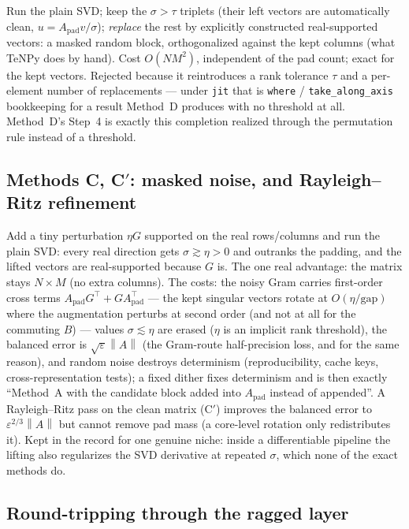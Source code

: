 \documentclass[11pt]{article}
\theoremstyle{definition}
\theoremstyle{remark}
\newcommand{\Apad}{A_{\mathrm{pad}}}
\newcommand{\norm}[1]{\left\lVert #1 \right\rVert}
\newcommand{\code}[1]{\texttt{#1}}
\begin{document}
Run the plain SVD; keep the $\sigma > \tau$ triplets (their left vectors are automatically clean,
$u = \Apad v/\sigma$); \emph{replace} the rest by explicitly constructed real-supported vectors: a
masked random block, orthogonalized against the kept columns (what TeNPy does by hand). Cost
$O(NM^2)$, independent of the pad count; exact for the kept vectors. Rejected because it
reintroduces a rank tolerance $\tau$ and a per-element number of replacements --- under \code{jit}
that is \code{where} / \code{take\_along\_axis} bookkeeping for a result Method~D produces with no
threshold at all. Method~D's Step~4 is exactly this completion realized through the permutation
rule instead of a threshold.

\subsection{Methods C, C$'$: masked noise, and Rayleigh--Ritz refinement}\label{app:C}

Add a tiny perturbation $\eta G$ supported on the real rows/columns and run the plain SVD: every
real direction gets $\sigma \gtrsim \eta > 0$ and outranks the padding, and the lifted vectors are
real-supported because $G$ is. The one real advantage: the matrix stays $N\times M$ (no extra
columns). The costs: the noisy Gram carries first-order cross terms $\Apad G^{\top} + G\Apad^{\top}$
--- the kept singular vectors rotate at $O(\eta/\mathrm{gap})$ where the augmentation perturbs at
second order (and not at all for the commuting $B$) --- values $\sigma\lesssim\eta$ are erased
($\eta$ is an implicit rank threshold), the balanced error is $\sqrt{\varepsilon}\norm{A}$ (the
Gram-route half-precision loss, and for the same reason), and random noise destroys determinism
(reproducibility, cache keys, cross-representation tests); a fixed dither fixes determinism and is
then exactly ``Method~A with the candidate block added into $\Apad$ instead of appended''. A
Rayleigh--Ritz pass on the clean matrix (C$'$) improves the balanced error to
$\varepsilon^{2/3}\norm{A}$ but cannot remove pad mass (a core-level rotation only redistributes
it). Kept in the record for one genuine niche: inside a differentiable pipeline the lifting also
regularizes the SVD derivative at repeated $\sigma$, which none of the exact methods do.

\subsection{Round-tripping through the ragged layer}\label{app:ragged}
\end{document}
